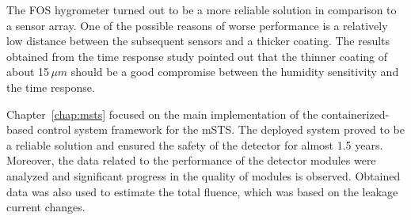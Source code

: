 The \gls{FOS} hygrometer turned out to be a more reliable solution in comparison to a sensor array. One of the possible reasons of  worse performance is a relatively low distance between the subsequent sensors and a thicker coating. The results obtained from the time response study pointed out that the thinner coating of about 15\,$\mu m$ should be a good compromise between the humidity sensitivity and the time response. 

Chapter~\ref{chap:msts} focused on the main implementation of the containerized-based control system framework for the \gls{mSTS}. The deployed system proved to be a reliable solution and ensured the safety of the detector for almost 1.5 years. Moreover, the data related to the performance of the detector modules were analyzed and significant progress in the quality of modules is observed. Obtained data was also used to estimate the total fluence, which was based on the leakage current changes. 